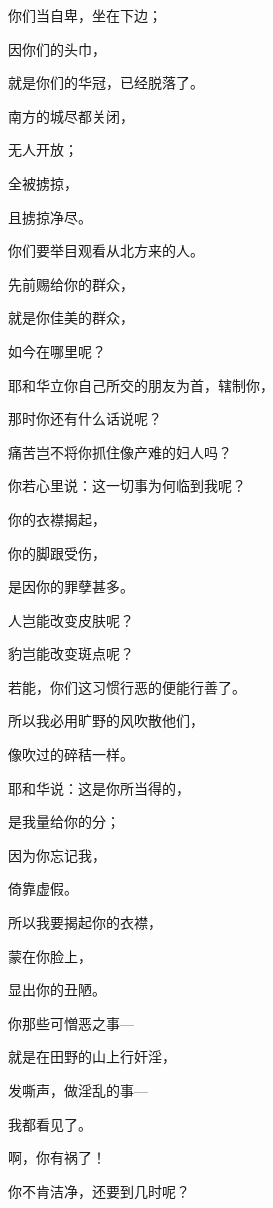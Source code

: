 {\par }{\Q 你们当自卑，坐在下边；
\par }{\Q 因你们的头巾，
\par }{\Q 就是你们的华冠，已经脱落了。
\par }{\Q {}南方的城尽都关闭，
\par }{\Q 无人开放；
\par }{全被掳掠，
\par }{\Q 且掳掠净尽。
\par }{\BB \par }{\Q {}你们要举目观看从北方来的人。
\par }{\Q 先前赐给你的群众，
\par }{\Q 就是你佳美的群众，
\par }{\Q 如今在哪里呢？
\par }{\Q {}耶和华立你自己所交的朋友为首，辖制你，
\par }{\Q 那时你还有什么话说呢？
\par }{\Q 痛苦岂不将你抓住像产难的妇人吗？
\par }{\Q {}你若心里说：这一切事为何临到我呢？
\par }{\Q 你的衣襟揭起，
\par }{\Q 你的脚跟受伤，
\par }{\Q 是因你的罪孽甚多。
\par }{\Q {}人岂能改变皮肤呢？
\par }{\Q 豹岂能改变斑点呢？
\par }{\Q 若能，你们这习惯行恶的便能行善了。
\par }{\Q {}所以我必用旷野的风吹散他们，
\par }{\Q 像吹过的碎秸一样。
\par }{\Q {}耶和华说：这是你所当得的，
\par }{\Q 是我量给你的分；
\par }{\Q 因为你忘记我，
\par }{\Q 倚靠虚假。
\par }{\Q {}所以我要揭起你的衣襟，
\par }{\Q 蒙在你脸上，
\par }{\Q 显出你的丑陋。
\par }{\Q {}你那些可憎恶之事—
\par }{\Q 就是在田野的山上行奸淫，
\par }{\Q 发嘶声，做淫乱的事—
\par }{\Q 我都看见了。
\par }{啊，你有祸了！
\par }{\Q 你不肯洁净，还要到几时呢？

}
